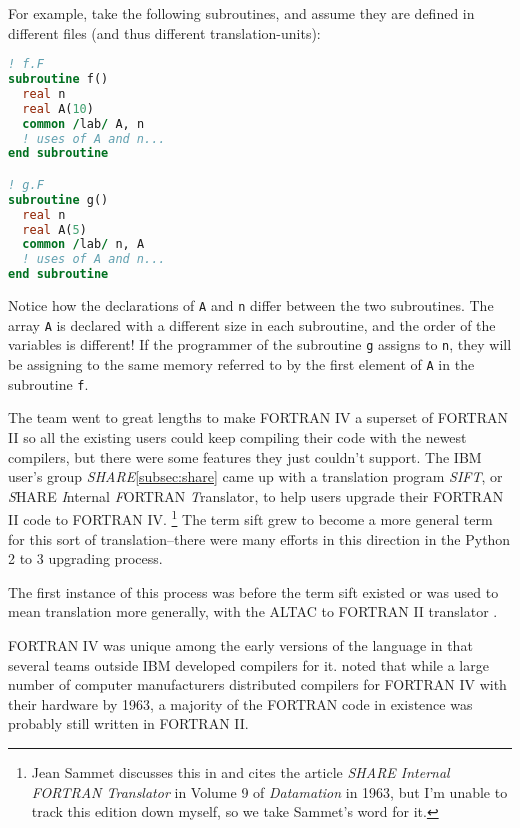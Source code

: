 For example, take the following subroutines, and assume they are
defined in different files (and thus different \gls{translation-unit}s):

\begin{lstlisting}[language=fortran,frame=single]
! f.F
subroutine f()
  real n
  real A(10)
  common /lab/ A, n
  ! uses of A and n...
end subroutine

! g.F
subroutine g()
  real n
  real A(5)
  common /lab/ n, A
  ! uses of A and n...
end subroutine
\end{lstlisting}

Notice how the declarations of \texttt{A} and \texttt{n} differ between the two
subroutines. The array \texttt{A} is declared with a different size in each subroutine,
and the order of the variables is different!
If the programmer of the subroutine \texttt{g} assigns to \texttt{n}, they
will be assigning to the same memory referred to by the first element of \texttt{A}
in the subroutine \texttt{f}.

The team went to great lengths to make FORTRAN IV a superset of FORTRAN II
so all the existing users could keep compiling their code with the newest
compilers, but there were some features they just couldn't support.
The IBM user's group \textit{SHARE}\cref{subsec:share} came up with a
translation program \textit{SIFT}, or
\textit{S}HARE \textit{I}nternal \textit{F}ORTRAN \textit{T}ranslator,
to help users upgrade their FORTRAN II code to FORTRAN IV.
\footnote{
	Jean Sammet discusses this in 
	and cites the article \textit{SHARE Internal FORTRAN Translator} in
	Volume 9 of \textit{Datamation} in 1963, but I'm unable to track this
	edition down myself, so we take Sammet's word for it.}
The term \gls{sift} grew to become a more general term for this sort of
translation--there were many efforts in this direction in the Python 2 to
3 upgrading process.

The first instance of this process was before the term \gls{sift}
existed or was used to mean translation more generally, with
the ALTAC to FORTRAN II translator \cite{olsen_altac_fortranii_translator_1965}.

FORTRAN IV was unique among the early versions of the language in that
several teams outside IBM developed compilers for it.
\citeauthor{backus_heising_fortran_1964} noted that while a large number
of computer manufacturers distributed compilers for FORTRAN IV with
their hardware by 1963, a majority of the FORTRAN code in existence
was probably still written in FORTRAN II\cite{backus_heising_fortran_1964}.

